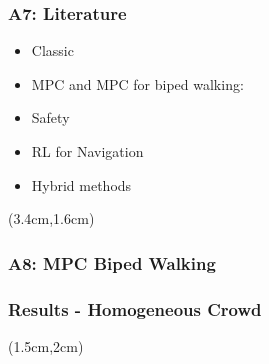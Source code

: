 \documentclass[navbaroff]{sdqbeamer}
\begin{document}
\begin{frame}[label={app7}]
\frametitle{A7: Literature}
\begin{itemize}
        \Fontssmaller
        \item Classic
            \pause
        \item MPC and MPC for biped walking: \cite{mpcbook,mayne_receding_1990,mayne_constrained_2000,schouwenaars_receding_2004,kajita_biped_2003,wieber_trajectory_2006,wieber_viability_2008,herdt_online_2010,sherikov_balance_2016,bohorquez_safe_2016,villa_model_2017,dorante_design_2018,zheng_online_2020, ciocca_balance_2020}
        \item Safety \cite{fraichard_inevitable_2003,fraichard_short_2007,martinez-gomez_efficient_2008,macek_towards_2009,bouraine_provably_2012,fraichard_will_2014,blumentals_safe_2017,ciocca_time_2023}
        \item RL for Navigation
        \item Hybrid methods
\end{itemize}
    \begin{textblock*}{13cm}(3.4cm,1.6cm)
    \end{textblock*}
\end{frame}


\begin{frame}[label={app8}]
\frametitle{A8: MPC Biped Walking}
\end{frame}


\begin{frame}[label={results}]
\frametitle{Results - Homogeneous Crowd}
    \begin{textblock*}{10cm}(1.5cm,2cm)
        \resizebox{14cm}{!}{}
    \end{textblock*}
\end{frame}
\end{document}
